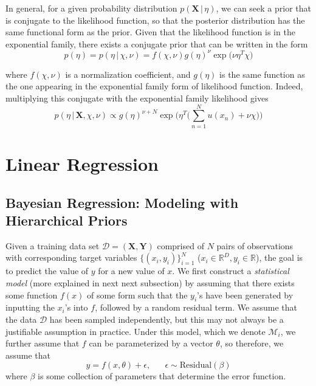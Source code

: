 \documentclass{article}
\begin{document}
    In general, for a given probability distribution $p(\mathbf{X}\,|\, \eta)$, we can seek a prior that is conjugate to the likelihood function, so that the posterior distribution has the same functional form as the prior. Given that the likelihood function is in the exponential family, there exists a conjugate prior that can be written in the form
    \begin{equation}
      p(\eta) = p(\eta\,|\, \chi, \nu) = f(\chi, \nu) g(\eta)^\nu \exp \big( \nu \eta^T \chi \big)
    \end{equation}

    where $f(\chi, \nu)$ is a normalization coefficient, and $g(\eta)$ is the same function as the one appearing in the exponential family form of likelihood function. Indeed, multiplying this conjugate with the exponential family likelihood gives
    \begin{equation}
      p(\eta\,|\, \mathbf{X}, \chi, \nu) \propto g(\eta)^{\nu + N} \exp \Bigg( \eta^T \bigg( \sum_{n=1}^N u(x_n) + \nu \chi \bigg) \Bigg)
    \end{equation}

\section{Linear Regression}

  \subsection{Bayesian Regression: Modeling with Hierarchical Priors}

    Given a training data set $\mathcal{D} = (\mathbf{X}, \mathbf{Y})$ comprised of $N$ pairs of observations with corresponding target variables $\{(x_i, y_i)\}_{i=1}^N$ ($x_i \in \mathbb{R}^D, y_i \in \mathbb{R}$), the goal is to predict the value of $y$ for a new value of $x$. We first construct a \textit{statistical model} (more explained in next next subsection) by assuming that there exists some function $f(x)$ of some form such that the $y_i$'s have been generated by inputting the $x_i$'s into $f$, followed by a random residual term. We assume that the data $\mathcal{D}$ has been sampled independently, but this may not always be a justifiable assumption in practice. Under this model, which we denote $\mathcal{M}_i$, we further assume that $f$ can be parameterized by a vector $\theta$, so therefore, we assume that
    \begin{equation}
      y = f(x, \theta) + \epsilon, \;\;\;\;\;\; \epsilon \sim \text{Residual} (\beta)
    \end{equation}
    where $\beta$ is some collection of parameters that determine the error function.
\end{document}

